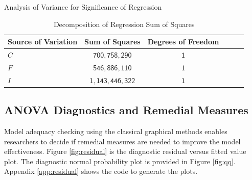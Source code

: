 \documentclass[11pt]{article}
\begin{document}
\begin{table}[h!]
\centering
\caption{Analysis of Variance for Significance of Regression} 
\label{tab:anova3a}

\caption{Decomposition of Regression Sum of Squares} 
\label{tab:anova3b}
\begin{tabular}{lccccc}
\toprule
\textbf{Source of Variation} & \textbf{Sum of Squares} & \textbf{Degrees of Freedom} \\ 
\midrule
$C$ & $\mathsf{700,758,290}$ & $\mathsf{1}$ \\
$F$ & $\mathsf{546,886,110}$ & $\mathsf{1}$ \\
$I$ & $\mathsf{1,143,446,322}$ & $\mathsf{1}$ \\
\bottomrule
\end{tabular}
\end{table}

\subsection{ANOVA Diagnostics and Remedial Measures}
Model adequacy checking using the classical graphical methods enables researchers to decide if remedial measures are needed to improve the model effectiveness. Figure \ref{fig:residual} is the diagnostic residual versus fitted value plot. The diagnostic normal probability plot is provided in Figure \ref{fig:qq}. Appendix \ref{app:residual} shows the code to generate the plots.
\end{document}
